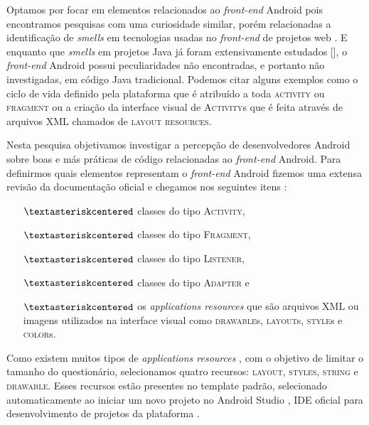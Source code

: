 Optamos por focar em elementos relacionados ao \textit{front-end} Android pois encontramos pesquisas com uma curiosidade similar, por\'em relacionadas a identifica\c{c}\~ao de \textit{smells} em tecnologias usadas no \textit{front-end} de projetos web \cite{CSSCodeSmell, BB, FinavaroAniche2016}. E enquanto que \textit{smells} em projetos Java j\'a foram extensivamente estudados [], o \textit{front-end} Android possui peculiaridades n\~ao encontradas, e portanto n\~ao investigadas, em c\'odigo Java tradicional. Podemos citar alguns exemplos como o ciclo de vida definido pela plataforma que \'e atribu\'ido a toda \textsc{activity} ou \textsc{fragment} ou a criação da interface visual de \textsc{Activity}s que \'e feita atrav\'es de arquivos XML chamados de \textsc{layout resources}.

Nesta pesquisa objetivamos investigar a percep\c{c}\~ao de desenvolvedores Android sobre boas e m\'as pr\'aticas de c\'odigo relacionadas ao \textit{front-end} Android. Para definirmos quais elementos representam o \textit{front-end} Android fizemos uma extensa revis\~ao da documenta\c{c}\~ao oficial e chegamos nos seguintes itens \cite{AndroidDeveloperSite2016}:

\begin{itemize} 
	\item[$\textasteriskcentered$] classes do tipo \textsc{Activity},
	\item[$\textasteriskcentered$] classes do tipo \textsc{Fragment},
	\item[$\textasteriskcentered$] classes do tipo \textsc{Listener}, 
	\item[$\textasteriskcentered$] classes do tipo \textsc{Adapter} e
	\item[$\textasteriskcentered$] os \textit{applications resources} que s\~ao arquivos XML ou imagens utilizados na interface visual como \textsc{drawable}s, \textsc{layout}s, \textsc{style}s e \textsc{color}s.
\end{itemize}

Como existem muitos tipos de \textit{applications resources} \cite{AndroidResourcesOverview}, com o objetivo de limitar o tamanho do question\'ario, selecionamos quatro recursos: \textsc{layout}, \textsc{styles}, \textsc{string} e \textsc{drawable}. Esses recursos est\~ao presentes no template padr\~ao, selecionado automaticamente ao iniciar um novo projeto no Android Studio \cite{FirstApp2017}, IDE oficial para desenvolvimento de projetos da plataforma \cite{AndroidStudio}. \\

